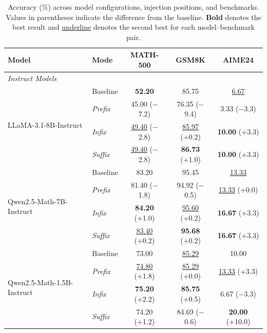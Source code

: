 \begin{table}[H]
\centering
\caption{Accuracy (\%) across model configurations, injection positions, and benchmarks. Values in parentheses indicate the difference from the baseline. \textbf{Bold} denotes the best result and \underline{underline} denotes the second best for each model--benchmark pair.}
\label{tab:performance_full}
\footnotesize
\renewcommand{\arraystretch}{0.9}
\begin{tabular}{ll ccc}
\toprule
\textbf{Model} & \textbf{Mode} & \textbf{MATH-500} & \textbf{GSM8K} & \textbf{AIME24} \\
\midrule
\multicolumn{5}{l}{\textit{Instruct Models}} \\
\midrule
\multirow{4}{*}{LLaMA-3.1-8B-Instruct} & Baseline & \textbf{52.20} & 85.75 & \underline{6.67} \\
 & \emph{Prefix} & 45.00 {\scriptsize($-$7.2)} & 76.35 {\scriptsize($-$9.4)} & 3.33 {\scriptsize($-$3.3)} \\
 & \emph{Infix} & \underline{49.40} {\scriptsize($-$2.8)} & \underline{85.97} {\scriptsize(+0.2)} & \textbf{10.00} {\scriptsize(+3.3)} \\
 & \emph{Suffix} & \underline{49.40} {\scriptsize($-$2.8)} & \textbf{86.73} {\scriptsize(+1.0)} & \textbf{10.00} {\scriptsize(+3.3)} \\
\midrule
\multirow{4}{*}{Qwen2.5-Math-7B-Instruct} & Baseline & 83.20 & 95.45 & \underline{13.33} \\
 & \emph{Prefix} & 81.40 {\scriptsize($-$1.8)} & 94.92 {\scriptsize($-$0.5)} & \underline{13.33} {\scriptsize(+0.0)} \\
 & \emph{Infix} & \textbf{84.20} {\scriptsize(+1.0)} & \underline{95.60} {\scriptsize(+0.2)} & \textbf{16.67} {\scriptsize(+3.3)} \\
 & \emph{Suffix} & \underline{83.40} {\scriptsize(+0.2)} & \textbf{95.68} {\scriptsize(+0.2)} & \textbf{16.67} {\scriptsize(+3.3)} \\
\midrule
\multirow{4}{*}{Qwen2.5-Math-1.5B-Instruct} & Baseline & 73.00 & \underline{85.29} & 10.00 \\
 & \emph{Prefix} & \underline{74.80} {\scriptsize(+1.8)} & \underline{85.29} {\scriptsize(+0.0)} & \underline{13.33} {\scriptsize(+3.3)} \\
 & \emph{Infix} & \textbf{75.20} {\scriptsize(+2.2)} & \textbf{85.75} {\scriptsize(+0.5)} & 6.67 {\scriptsize($-$3.3)} \\
 & \emph{Suffix} & 74.20 {\scriptsize(+1.2)} & 84.69 {\scriptsize($-$0.6)} & \textbf{20.00} {\scriptsize(+10.0)} \\

\end{tabular}
\end{table}
